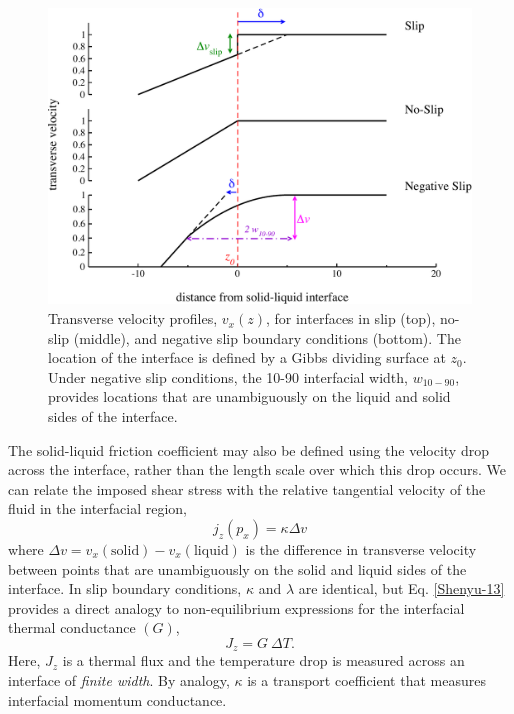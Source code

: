 \documentclass[journal = jpccck, manuscript = article]{achemso}
\begin{document}
\begin{figure}
\includegraphics[width=\linewidth]{slipLengthPlot}
\caption{\label{fig:slipLength} Transverse velocity profiles,
  $v_x(z)$, for interfaces in slip (top), no-slip (middle), and
  negative slip boundary conditions (bottom).  The location of the
  interface is defined by a Gibbs dividing surface at $z_0$. Under
  negative slip conditions, the 10-90 interfacial width, $w_{10-90}$,
  provides locations that are unambiguously on the liquid and solid
  sides of the interface.\label{fig:slipLengthPlot}}
\end{figure}

The solid-liquid friction coefficient may also be defined using the
velocity drop across the interface, rather than the length scale over
which this drop occurs. We can relate the imposed shear stress with
the relative tangential velocity of the fluid in the interfacial
region,\cite{Kuang2012}
\begin{equation}\label{Shenyu-13}
j_{z}(p_{x}) = \kappa \Delta v
\end{equation}
where $\Delta v = v_{x}(\mathrm{solid}) - v_{x}(\mathrm{liquid})$ is
the difference in transverse velocity between points that are
unambiguously on the solid and liquid sides of the interface.  In slip
boundary conditions, $\kappa$ and $\lambda$ are identical, but
Eq. \eqref{Shenyu-13} provides a direct analogy to non-equilibrium
expressions for the interfacial thermal conductance $(G)$,
\begin{equation}
J_z = G~ \Delta T.
\end{equation}
Here, $J_z$ is a thermal flux and the temperature drop is measured
across an interface of \textit{finite width}. By analogy, $\kappa$ is
a transport coefficient that measures interfacial momentum
conductance.
\end{document}
